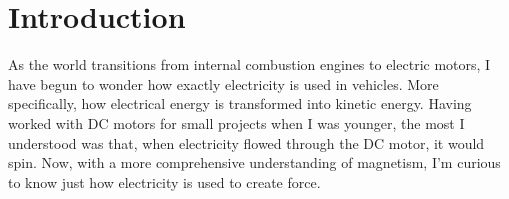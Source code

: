 \section{Introduction}

As the world transitions from internal combustion engines to electric motors, I have begun to wonder how exactly electricity is used in vehicles.
More specifically, how electrical energy is transformed into kinetic energy.
Having worked with DC motors for small projects when I was younger, the most I understood was that, when electricity flowed through the DC motor, it would spin.
Now, with a more comprehensive understanding of magnetism, I'm curious to know just how electricity is used to create force.

